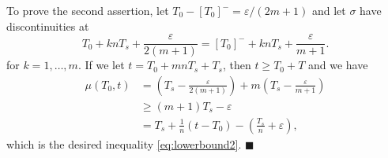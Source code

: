 \documentclass[a4, 11pt]{article}
\begin{document}
To prove the second assertion, let $T_0 - [T_0]^- = \varepsilon/(2m+1)$ and let
$\sigma$ have discontinuities at
\begin{equation*}
T_0+ knT_s + \frac{\varepsilon}{2(m+1)}
= [T_0]^- + knT_s + \frac{\varepsilon}{m+1}.
\end{equation*}
for $k=1,\dots,m$.
If we let $t = T_0+mnT_s+T_s$, then $t \geq T_0 +T$ and we have
\begin{align*}
\mu(T_0,t) 
&= \left(T_s - \frac{\varepsilon}{2(m+1)}\right) + 
m\left(T_s - \frac{\varepsilon}{m+1} \right) \\
&\geq (m+1)T_s - \varepsilon \\
&= T_s + \frac{1}{n}(t-T_0) 
- \left( \frac{T_s}{n} + \varepsilon\right),
\end{align*}
which is the desired inequality \eqref{eq:lowerbound2}.
\hfill $\blacksquare$
\end{document}
